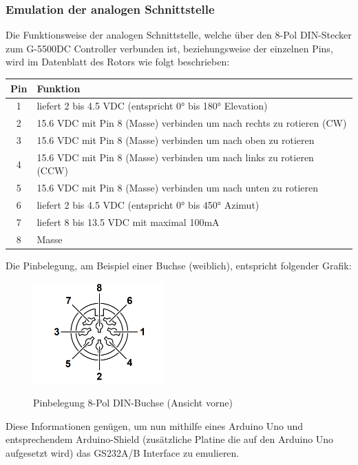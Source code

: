 \subsubsection{Emulation der analogen Schnittstelle}
\label{subsubsec:emulation_analoge_schnittstelle}
Die Funktionsweise der analogen Schnittstelle, welche über den 8-Pol DIN-Stecker zum G-5500DC Controller verbunden ist, beziehungsweise der einzelnen Pins, wird im Datenblatt des Rotors \cite{noauthor_yaesu_nodate} wie folgt beschrieben:

\begin{tabular}{| c | l |}
	\hline
	\textbf{Pin} & \textbf{Funktion} \\
	\hline
	1 & liefert 2 bis 4.5 VDC (entspricht 0° bis 180° Elevation) \\
	\hline
	2 & 15.6 VDC mit Pin 8 (Masse) verbinden um nach rechts zu rotieren (CW) \\
	\hline
	3 & 15.6 VDC mit Pin 8 (Masse) verbinden um nach oben zu rotieren \\
	\hline
	4 & 15.6 VDC mit Pin 8 (Masse) verbinden um nach links zu rotieren (CCW) \\
	\hline
	5 & 15.6 VDC mit Pin 8 (Masse) verbinden um nach unten zu rotieren \\
	\hline
	6 & liefert 2 bis 4.5 VDC (entspricht 0° bis 450° Azimut) \\
	\hline
	7 & liefert 8 bis 13.5 VDC mit maximal 100mA \\
	\hline
	8 & Masse \\
	\hline
\end{tabular}

Die Pinbelegung, am Beispiel einer Buchse (weiblich), entspricht folgender Grafik: 
\begin{figure}[H]
	\cite{noauthor_yaesu_nodate}
	\centering
	\includegraphics[width=5cm]{../ref/RotorInterfacePinbelegung.png}
	\label{fig:Rotor_Interface_Pinbelegung}
	\caption{Pinbelegung 8-Pol DIN-Buchse (Ansicht vorne)}
\end{figure}

Diese Informationen genügen, um nun mithilfe eines Arduino Uno und entsprechendem Arduino-Shield (zusätzliche Platine die auf den Arduino Uno aufgesetzt wird) das GS232A/B Interface zu emulieren.


